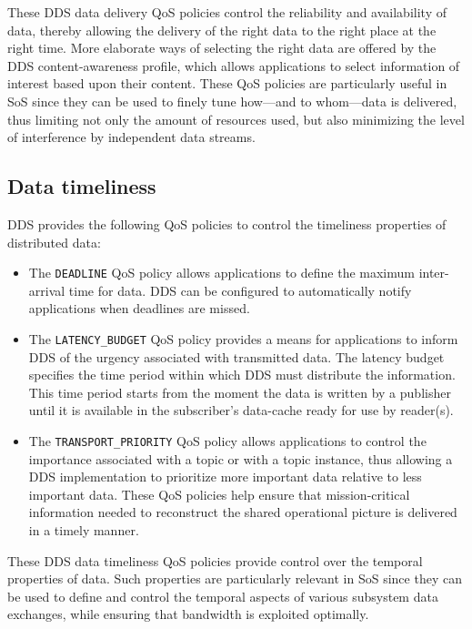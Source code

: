 These \ac{DDS} data delivery \ac{QoS} policies control the reliability
and availability of data, thereby allowing the delivery of the right
data to the right place at the right time.  More elaborate ways of
selecting the right data are offered by the \ac{DDS} content-awareness
profile, which allows applications to select information of interest
based upon their content.  These \ac{QoS} policies are particularly
useful in \ac{SoS} since they can be used to finely tune how---and to
whom---data is delivered, thus limiting not only the amount of
resources used, but also minimizing the level of interference by
independent data streams.

\subsection{Data timeliness} 
DDS provides the following \ac{QoS} policies to control the timeliness
properties of distributed data:
\begin{itemize}

	\item The \texttt{DEADLINE} \ac{QoS} policy allows
          applications to define the maximum inter-arrival time for
          data. \ac{DDS} can be configured to automatically notify
          applications when deadlines are missed.

	\item The \texttt{LATENCY\_BUDGET} QoS policy provides a means
          for applications to inform \ac{DDS} of the urgency
          associated with transmitted data.  The latency budget
          specifies the time period within which \ac{DDS} must
          distribute the information. This time period starts from the
          moment the data is written by a publisher until it is
          available in the subscriber’s data-cache ready for use by
          reader(s).

	\item The \texttt{TRANSPORT\_PRIORITY} QoS policy allows
          applications to control the importance associated with a
          topic or with a topic instance, thus allowing a DDS
          implementation to prioritize more important data relative to
          less important data. These QoS policies help ensure that
          mission-critical information needed to reconstruct the
          shared operational picture is delivered in a timely manner.
\end{itemize}
These \ac{DDS} data timeliness \ac{QoS} policies provide control over
the temporal properties of data.  Such properties are particularly
relevant in \ac{SoS} since they can be used to define and control the
temporal aspects of various subsystem data exchanges, while ensuring
that bandwidth is exploited optimally.

